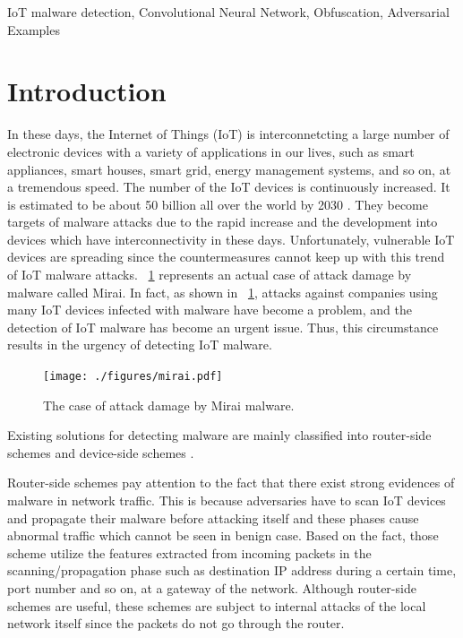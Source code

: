 \documentclass{ieeeaccess}
\begin{document}
\begin{keywords} 
 IoT malware detection, Convolutional Neural Network, Obfuscation, Adversarial Examples 
 \end{keywords}

\titlepgskip=-15pt

\maketitle

\section{Introduction}  \label{sec:introduction}
In these days, the Internet of Things (IoT) is interconnetcting a large number of electronic devices with a variety of applications in our lives, such as smart appliances, smart houses, smart grid, energy management systems, and so on, at a tremendous speed.
The number of the IoT devices is continuously increased.
It is estimated to be about 50 billion all over the world by 2030 \cite{bg1, bg2}.
They become targets of malware attacks due to the rapid increase and the development into devices which have interconnectivity in these days.
Unfortunately, vulnerable IoT devices are spreading since the countermeasures cannot keep up with this trend of IoT malware attacks.
\figurename~\ref{fig:mirai} represents an actual case of attack damage by malware called Mirai.
In fact, as shown in \figurename~\ref{fig:mirai}, attacks against companies using many IoT devices infected with malware have become a problem, and the detection of IoT malware has become an urgent issue.
Thus, this circumstance results in the urgency of detecting IoT malware.

\begin{figure}[t]
 \centering
 \texttt{[image: ./figures/mirai.pdf]}
 \caption{The case of attack damage by Mirai malware.} 
 \label{fig:mirai}
\end{figure}
Existing solutions for detecting malware are mainly classified into router-side schemes \cite{net} and device-side schemes \cite{om, hwang, cfg, cfg2}.

Router-side schemes pay attention to the fact that there exist strong evidences of malware in network traffic.
This is because adversaries have to scan IoT devices and propagate their malware before attacking itself and these phases cause abnormal traffic which cannot be seen in benign case.
Based on the fact, those scheme utilize the features extracted from incoming packets in the scanning/propagation phase such as destination IP address during a certain time, port number and so on, at a gateway of the network.
Although router-side schemes are useful, these schemes are subject to internal attacks of the local network itself since the packets do not go through the router.
\end{document}
